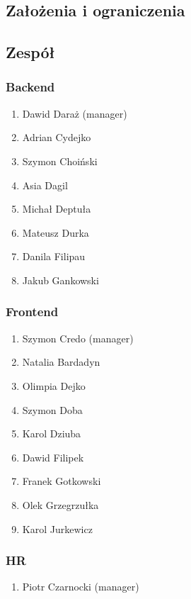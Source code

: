 \documentclass[]{report}
\begin{document}
\subsection{Założenia i ograniczenia}


\subsection{Zespół}

\subsubsection{Backend}

	\begin{enumerate}
        \item Dawid Daraż (manager)
        \item Adrian Cydejko
        \item Szymon Choiński
		\item Asia Dagil
        \item Michał Deptuła
		\item Mateusz Durka
        \item Danila Filipau
		\item Jakub Gankowski
	\end{enumerate}
    
\subsubsection{Frontend}

	\begin{enumerate}
		\item Szymon Credo (manager)
        \item Natalia Bardadyn
        \item Olimpia Dejko
        \item Szymon Doba
        \item Karol Dziuba
        \item Dawid Filipek
        \item Franek Gotkowski
        \item Olek Grzegrzułka
        \item Karol Jurkewicz
	\end{enumerate}

\subsubsection{HR}
	\begin{enumerate}
		\item Piotr Czarnocki (manager)
	\end{enumerate}
\end{document}
